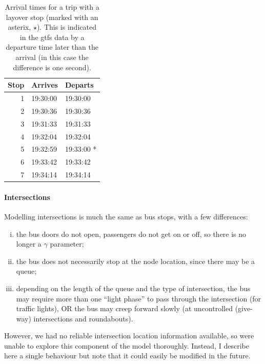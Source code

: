 \begin{knitrout}\small
{}\color{fgcolor}\begin{table}

\caption[Arrival times for a trip with a layover]{\label{tab:layover_times}Arrival times for a trip with a layover stop (marked with an asterix, $\star$). This is indicated in the \gls{gtfs} data by a departure time later than the arrival (in this case the difference is one second).}
\centering
\fontsize{8}{10}\selectfont
\begin{tabular}[t]{rll}
\toprule
Stop & Arrives & Departs\\
\midrule
1 & 19:30:00 & 19:30:00\\
2 & 19:30:36 & 19:30:36\\
3 & 19:31:33 & 19:31:33\\
4 & 19:32:04 & 19:32:04\\
5 & 19:32:59 & 19:33:00 *\\
6 & 19:33:42 & 19:33:42\\
7 & 19:34:14 & 19:34:14\\
\bottomrule
\end{tabular}
\end{table}


\end{knitrout}




\paragraph{Intersections}

Modelling intersections is much the same as bus stops, with a few differences:
\begin{enumerate}[i.]
\item the bus doors do not open, passengers do not get on or off, so there is no longer a $\gamma$ parameter;
\item the bus does not necessarily stop at the node location, since there may be a queue;
\item depending on the length of the queue and the type of intersection, the bus may require more than one ``light phase'' to pass through the intersection (for traffic lights), OR the bus may creep forward slowly (at uncontrolled (give-way) intersections and roundabouts).
\end{enumerate}
However, we had no reliable intersection location information available, so were unable to explore this component of the model thoroughly. Instead, I describe here a single behaviour but note that it could easily be modified in the future.

